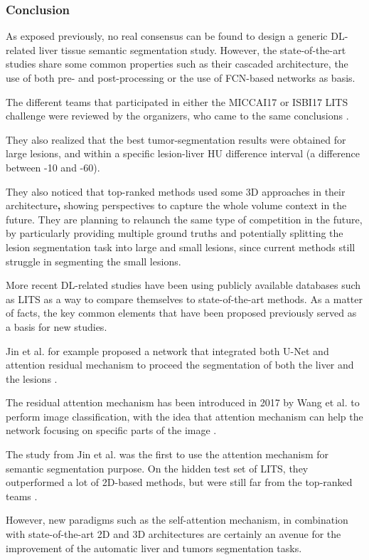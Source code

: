 \documentclass[]{article}
\begin{document}
\subsubsection*{Conclusion}

As exposed previously, no real consensus can be found to design a
generic DL-related liver tissue semantic segmentation study. However,
the state-of-the-art studies share some common properties such as their
cascaded architecture, the use of both pre- and post-processing or the
use of FCN-based networks as basis.

The different teams that participated in either the MICCAI17 or ISBI17
LITS challenge were reviewed by the organizers, who came to the same
conclusions \cite{Bilic2019}.

They also realized that the best tumor-segmentation results were
obtained for large lesions, and within a specific lesion-liver HU
difference interval (a difference between -10 and -60).

They also noticed that top-ranked methods used some 3D approaches in
their architecture\textbf{,} showing perspectives to capture the whole
volume context in the future. They are planning to relaunch the same
type of competition in the future, by particularly providing multiple
ground truths and potentially splitting the lesion segmentation task
into large and small lesions, since current methods still struggle in
segmenting the small lesions.

More recent DL-related studies have been using publicly available
databases such as LITS as a way to compare themselves to
state-of-the-art methods. As a matter of facts, the key common elements
that have been proposed previously served as a basis for new studies.


Jin et al. for example proposed a network that
integrated both U-Net and attention residual mechanism to proceed the
segmentation of both the liver and the lesions \cite{Jin2018}.


The residual attention mechanism has been introduced in 2017 by Wang et al. to perform image classification, with the idea that attention mechanism
can help the network focusing on specific parts of the image \cite{Wang2017}.

The study from Jin et al. was the first to use the attention mechanism
for semantic segmentation purpose. On the hidden test set of LITS, they
outperformed a lot of 2D-based methods, but were still far from the
top-ranked teams \cite{Jin2018}.

However, new paradigms such as the self-attention mechanism, in
combination with state-of-the-art 2D and 3D architectures are certainly
an avenue for the improvement of the automatic liver and tumors
segmentation tasks.
\end{document}
